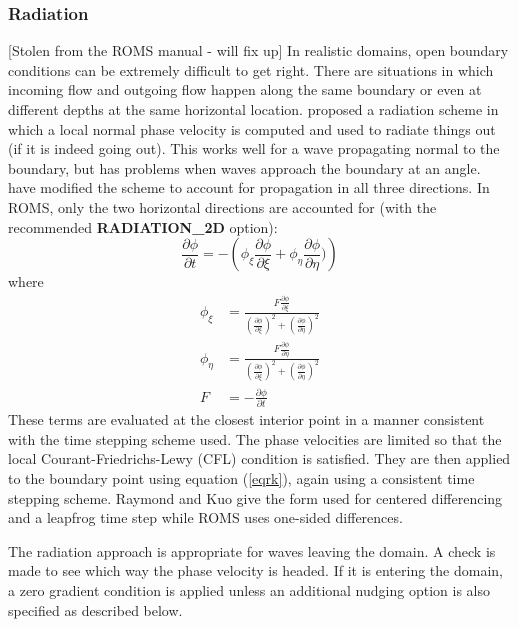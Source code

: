 \documentclass[11pt]{article}
\newcommand{\code}[1]{\mbox{\bf#1}}
\begin{document}
\subsubsection{Radiation}
[Stolen from the ROMS manual - will fix up]
In realistic domains, open boundary conditions can be extremely
difficult to get right. There are situations in which incoming flow and
outgoing flow happen along the same boundary or even at different
depths at the same horizontal location. \citet{Orlanski76}
proposed a radiation scheme in which a local normal phase velocity is
computed and used to radiate things out (if it is indeed going out).
This works well for a wave propagating normal to the boundary, but
has problems when waves approach the boundary at an angle.
\citet{Raymond84} have modified the scheme to account for
propagation in all three directions. In ROMS, only the two horizontal
directions are accounted for (with the recommended \code{RADIATION\_2D}
option):
\begin{equation}
   \frac{\partial \phi}{\partial t} = - \left( \phi_\xi \frac{\partial
   \phi}{\partial \xi} + \phi_\eta \frac{\partial \phi}{\partial \eta}) \right)
\label{eqrk}
\end{equation}
where
\begin{align}
  \phi_\xi & = \frac{F \frac{\partial \phi}{\partial \xi}}{
  \left( \frac{\partial \phi}{\partial \xi} \right)^2 +
  \left( \frac{\partial \phi}{\partial \eta} \right)^2 } \\ 
  \phi_\eta & = \frac{F \frac{\partial \phi}{\partial \eta}}{
  \left( \frac{\partial \phi}{\partial \xi} \right)^2 +
  \left( \frac{\partial \phi}{\partial \eta} \right)^2 } \\ 
   F & = - \frac{\partial \phi}{\partial t}
\end{align}
These terms are evaluated at the closest interior point in a manner
consistent with the time stepping scheme used. The phase velocities are
limited so that the local Courant-Friedrichs-Lewy (CFL) condition
is satisfied. They are then
applied to the boundary point using equation (\ref{eqrk}), again using
a consistent time stepping scheme. Raymond and Kuo give the form used
for centered differencing and a leapfrog time step while ROMS uses
one-sided differences.

The radiation approach is appropriate for waves leaving the domain. A
check is made to see which way the phase velocity is headed. If it
is entering the domain, a zero gradient condition is applied unless
an additional nudging option is also specified as described below.
\end{document}

